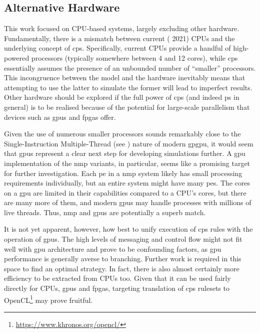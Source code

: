 \subsection{Alternative Hardware}
This work focused on CPU-based systems, largely excluding other hardware.  Fundamentally, there is a mismatch between current (\circa{} 2021) CPUs and the underlying concept of \gls{cps}.  Specifically, current CPUs provide a handful of high-powered processors (typically somewhere between 4 and 12 cores), while \gls{cps} essentially assumes the presence of an unbounded number of ``smaller'' processors.  This incongruence between the model and the hardware inevitably means that attempting to use the latter to simulate the former will lead to imperfect results.  Other hardware should be explored if the full power of \gls{cps} (and indeed \gls{ps} in general) is to be realised because of the potential for large-scale parallelism that devices such as \glspl{gpu} and \glspl{fpga} offer.

Given the use of numerous smaller processors sounds remarkably close to the Single-Instruction Multiple-Thread (see \cite[Ch. 4.4.1]{Hennessy2012}) nature of modern \gls{gpgpu}, it would seem that \glspl{gpu} represent a clear next step for developing simulations further.  A \gls{gpu} implementation of the \gls{nmp} variants, in particular, seems like a promising target for further investigation.  Each \gls{pe} in a \gls{nmp} system likely has small processing requirements individually, but an entire system might have many \glspl{pe}.  The cores on a \gls{gpu} are limited in their capabilities compared to a CPU's cores, but there are many more of them, and modern \glspl{gpu} may handle processes with millions of live threads.  Thus, \gls{nmp} and \glspl{gpu} are potentially a superb match.

It is not yet apparent, however, how best to unify execution of \gls{cps} rules with the operation of \glspl{gpu}.  The high levels of messaging and control flow might not fit well with \gls{gpu} architecture and prove to be confounding factors, as \gls{gpu} performance is generally averse to branching.  Further work is required in this space to find an optimal strategy.  In fact, there is also almost certainly more efficiency to be extracted from CPUs too.  Given that it can be used fairly directly for CPUs, \glspl{gpu} and \glspl{fpga}, targeting translation of \gls{cps} \glspl{ruleset} to OpenCL\footnote{\url{https://www.khronos.org/opencl/}} may prove fruitful.

